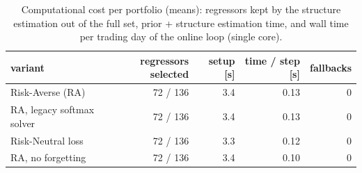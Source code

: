 \begin{table}[ht!]
\centering
\small
\setlength{\tabcolsep}{4pt}
\begin{tabular}{lrrrr}
\hline
variant & regressors selected & setup [s] & time / step [s] & fallbacks \\
\hline
Risk-Averse (RA) & 72 / 136 & 3.4 & 0.13 & 0 \\
RA, legacy softmax solver & 72 / 136 & 3.4 & 0.13 & 0 \\
Risk-Neutral loss & 72 / 136 & 3.3 & 0.12 & 0 \\
RA, no forgetting & 72 / 136 & 3.4 & 0.10 & 0 \\
\hline
\end{tabular}
\caption{Computational cost per portfolio (means): regressors kept by the structure estimation out of the full set, prior + structure estimation time, and wall time per trading day of the online loop (single core).}
\label{tab:runtime_bear2022}
\end{table}
